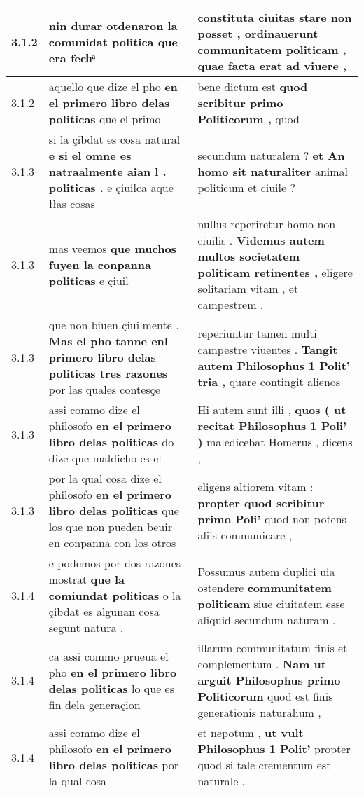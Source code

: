 \begin{tabular}{|p{1cm}|p{6.5cm}|p{6.5cm}|}
3.1.2 & nin durar \textbf{ otdenaron la comunidat politica } que era fechͣ & constituta ciuitas stare non posset , \textbf{ ordinauerunt communitatem politicam , } quae facta erat ad viuere , \\\hline
3.1.2 & aquello que dize el pho \textbf{ en el primero libro delas politicas } que el primo & bene dictum est \textbf{ quod scribitur primo Politicorum , } quod \\\hline
3.1.3 & si la çibdat es cosa natural \textbf{ e si el omne es natraalmente aian l . politicas . } e çiuilca aque łłas cosas & secundum naturalem ? \textbf{ et An homo sit naturaliter } animal politicum et ciuile ? \\\hline
3.1.3 & mas veemos \textbf{ que muchos fuyen la conpanna politicas } e çiuil & nullus reperiretur homo non ciuilis . \textbf{ Videmus autem multos societatem politicam retinentes , } eligere solitariam vitam , et campestrem . \\\hline
3.1.3 & que non biuen çiuilmente . \textbf{ Mas el pho tanne enl primero libro delas politicas tres razones } por las quales contesçe & reperiuntur tamen multi campestre viuentes . \textbf{ Tangit autem Philosophus 1 Polit’ tria , } quare contingit alienos \\\hline
3.1.3 & assi commo dize el philosofo \textbf{ en el primero libro delas politicas } do dize que maldicho es el & Hi autem sunt illi , \textbf{ quos ( ut recitat Philosophus 1 Poli’ ) } maledicebat Homerus , dicens , \\\hline
3.1.3 & por la qual cosa dize el philosofo \textbf{ en el primero libro delas politicas } que los que non pueden beuir en conpanna con los otros & eligens altiorem vitam : \textbf{ propter quod scribitur primo Poli’ } quod non potens aliis communicare , \\\hline
3.1.4 & e podemos por dos razones mostrat \textbf{ que la comiundat politicas } o la çibdat es algunan cosa segunt natura . & Possumus autem duplici uia ostendere \textbf{ communitatem politicam } siue ciuitatem esse aliquid secundum naturam . \\\hline
3.1.4 & ca assi commo prueua el pho \textbf{ en el primero libro delas politicas } lo que es fin dela generaçion & illarum communitatum finis et complementum . \textbf{ Nam ut arguit Philosophus primo Politicorum } quod est finis generationis naturalium , \\\hline
3.1.4 & assi commo dize el philosofo \textbf{ en el primero libro delas politicas } por la qual cosa & et nepotum , \textbf{ ut vult Philosophus 1 Polit’ } propter quod si tale crementum est naturale , \\\hline

\end{tabular}
